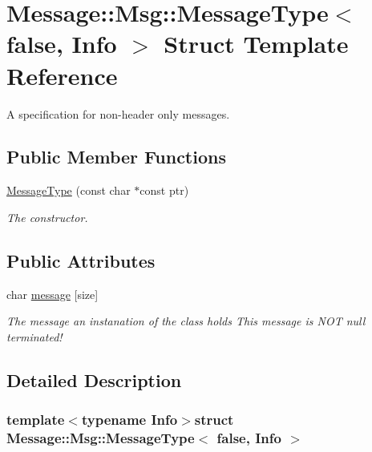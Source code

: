 \hypertarget{struct_message_1_1_msg_1_1_message_type_3_01false_00_01_info_01_4}{\section{Message\-:\-:Msg\-:\-:Message\-Type$<$ false, Info $>$ Struct Template Reference}
\label{struct_message_1_1_msg_1_1_message_type_3_01false_00_01_info_01_4}
}


A specification for non-\/header only messages.  


\subsection*{Public Member Functions}
\begin{DoxyCompactItemize}
\item 
\hyperlink{struct_message_1_1_msg_1_1_message_type_3_01false_00_01_info_01_4_a81f148929319c2b03cc46779af945bfb}{Message\-Type} (const char $\ast$const ptr)
\begin{DoxyCompactList}\small\item\em The constructor. \end{DoxyCompactList}\end{DoxyCompactItemize}
\subsection*{Public Attributes}
\begin{DoxyCompactItemize}
\item 
char \hyperlink{struct_message_1_1_msg_1_1_message_type_3_01false_00_01_info_01_4_a285ad1635e73a096386e61fc965a6038}{message} \mbox{[}size\mbox{]}
\begin{DoxyCompactList}\small\item\em The message an instanation of the class holds This message is N\-O\-T null terminated! \end{DoxyCompactList}\end{DoxyCompactItemize}


\subsection{Detailed Description}
\subsubsection*{template$<$typename Info$>$struct Message\-::\-Msg\-::\-Message\-Type$<$ false, Info $>$}

